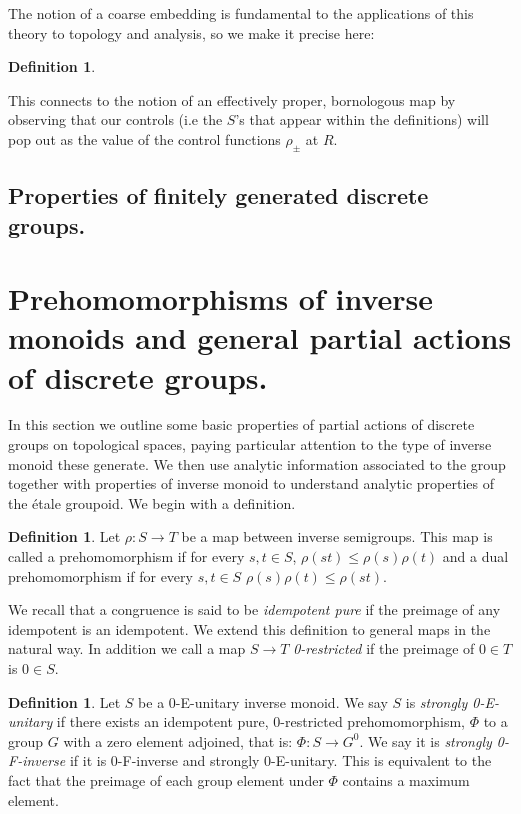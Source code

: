 \documentclass[11pt,]{amsbook}
\theoremstyle{plain}
\theoremstyle{definition}%
\newtheorem{definition}[theorem]{Definition}%
\theoremstyle{remark}%
\begin{document}
The notion of a coarse embedding is fundamental to the applications of this theory to topology and analysis, so we make it precise here:

\begin{definition}

\end{definition}

This connects to the notion of an effectively proper, bornologous map by observing that our controls (i.e the $S$'s that appear within the definitions) will pop out as the value of the control functions $\rho_{\pm}$ at $R$.

\subsection{Properties of finitely generated discrete groups.}

\section{Prehomomorphisms of inverse monoids and general partial actions of discrete groups.}\label{Sect:S3} 
In this section we outline some basic properties of partial actions of discrete groups on topological spaces, paying particular attention to the type of inverse monoid these generate. We then use analytic information associated to the group together with properties of inverse monoid to understand analytic properties of the \'etale groupoid. We begin with a definition.

\begin{definition}
Let $\rho: S \rightarrow T$ be a map between inverse semigroups. This map is called a prehomomorphism if for every $s,t \in S$, $\rho(st) \leq \rho(s)\rho(t)$ and a dual prehomomorphism if for every $s,t \in S$ $\rho(s)\rho(t) \leq \rho(st)$.
\end{definition}

We recall that a congruence is said to be \textit{idempotent pure} if the preimage of any idempotent is an idempotent. We extend this definition to general maps in the natural way. In addition we call a map $S \rightarrow T$ \textit{0-restricted} if the preimage of $0 \in T$ is $0 \in S$.

\begin{definition}
Let $S$ be a 0-E-unitary inverse monoid. We say $S$ is \textit{strongly 0-E-unitary} if there exists an idempotent pure, 0-restricted prehomomorphism, $\Phi$ to a group $G$ with a zero element adjoined, that is: $\Phi:S \rightarrow G^{0}$. We say it is \textit{strongly 0-F-inverse} if it is 0-F-inverse and strongly 0-E-unitary. This is equivalent to the fact that the preimage of each group element under $\Phi$ contains a maximum element.
\end{definition}
\end{document}
